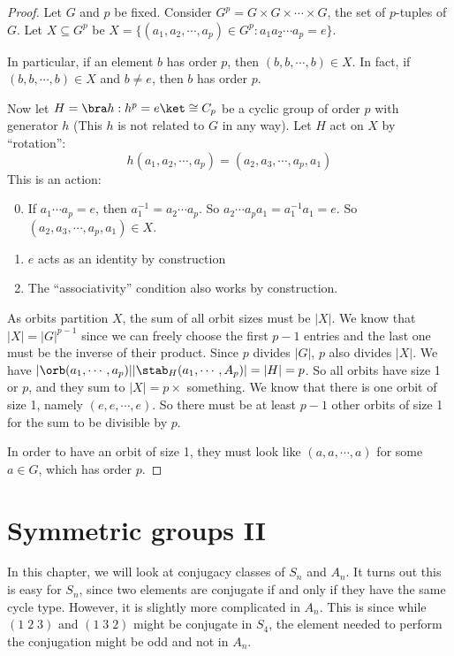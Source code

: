 \documentclass[a4paper]{article}
\begin{document}
\begin{proof}
  Let $G$ and $p$ be fixed. Consider $G^p = G\times G\times \cdots \times G$, the set of $p$-tuples of $G$. Let $X \subseteq G^p$ be $X = \{(a_1, a_2, \cdots, a_p)\in G^p: a_1a_2\cdots a_p = e\}$.

  In particular, if an element $b$ has order $p$, then $(b, b, \cdots, b)\in X$. In fact, if $(b, b, \cdots, b)\in X$ and $b\not= e$, then $b$ has order $p$.

  Now let $H = \bra h: h^p = e\ket\cong C_p$ be a cyclic group of order $p$ with generator $h$ (This $h$ is not related to $G$ in any way). Let $H$ act on $X$ by ``rotation'':
  \[
    h(a_1, a_2, \cdots, a_p) = (a_2, a_3, \cdots, a_p, a_1)
  \]
  This is an action:
  \begin{enumerate}[label=\arabic{*}.]
      \setcounter{enumi}{-1}
    \item If $a_1\cdots a_p = e$, then $a_1^{-1} = a_2\cdots a_p$. So $a_2\cdots a_pa_1 = a_1^{-1}a_1 = e$. So $(a_2, a_3, \cdots, a_p, a_1)\in X$.
    \item $e$ acts as an identity by construction
    \item The ``associativity'' condition also works by construction.
  \end{enumerate}

  As orbits partition $X$, the sum of all orbit sizes must be $|X|$. We know that $|X| = |G|^{p - 1}$ since we can freely choose the first $p - 1$ entries and the last one must be the inverse of their product. Since $p$ divides $|G|$, $p$ also divides $|X|$. We have $|\orb(a_1, \cdots , a_p)||\stab_H(a_1, \cdots, A_p)| = |H| = p$. So all orbits have size 1 or $p$, and they sum to $|X| = p\times$ something. We know that there is one orbit of size 1, namely $(e, e, \cdots, e)$. So there must be at least $p - 1$ other orbits of size 1 for the sum to be divisible by $p$.

  In order to have an orbit of size 1, they must look like ${(a, a, \cdots, a)}$  for some $a\in G$, which has order $p$.
\end{proof}

\section{Symmetric groups II}
In this chapter, we will look at conjugacy classes of $S_n$ and $A_n$. It turns out this is easy for $S_n$, since two elements are conjugate if and only if they have the same cycle type. However, it is slightly more complicated in $A_n$. This is since while $(1\; 2\; 3)$ and $(1\; 3\; 2)$ might be conjugate in $S_4$, the element needed to perform the conjugation might be odd and not in $A_n$.
\end{document}
